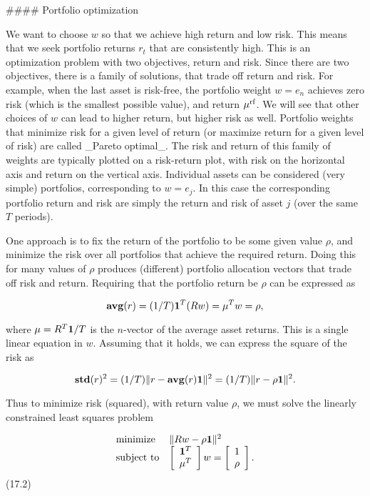 

#### Portfolio optimization

We want to choose \(w\) so that we achieve high return and low risk. This means that we seek portfolio returns \(r_{t}\) that are consistently high. This is an optimization problem with two objectives, return and risk. Since there are two objectives, there is a family of solutions, that trade off return and risk. For example, when the last asset is risk-free, the portfolio weight \(w=e_{n}\) achieves zero risk (which is the smallest possible value), and return \(\mu^{\rm rf}\). We will see that other choices of \(w\) can lead to higher return, but higher risk as well. Portfolio weights that minimize risk for a given level of return (or maximize return for a given level of risk) are called _Pareto optimal_. The risk and return of this family of weights are typically plotted on a risk-return plot, with risk on the horizontal axis and return on the vertical axis. Individual assets can be considered (very simple) portfolios, corresponding to \(w=e_{j}\). In this case the corresponding portfolio return and risk are simply the return and risk of asset \(j\) (over the same \(T\) periods).

One approach is to fix the return of the portfolio to be some given value \(\rho\), and minimize the risk over all portfolios that achieve the required return. Doing this for many values of \(\rho\) produces (different) portfolio allocation vectors that trade off risk and return. Requiring that the portfolio return be \(\rho\) can be expressed as

\[{\bf avg}(r)=(1/T){\bf 1}^{T}(Rw)=\mu^{T}w=\rho,\]

where \(\mu=R^{T}{\bf 1}/T\) is the \(n\)-vector of the average asset returns. This is a single linear equation in \(w\). Assuming that it holds, we can express the square of the risk as

\[{\bf std}(r)^{2}=(1/T)\|r-{\bf avg}(r){\bf 1}\|^{2}=(1/T)\|r-\rho{\bf 1}\|^{2}.\]

Thus to minimize risk (squared), with return value \(\rho\), we must solve the linearly constrained least squares problem

\[\begin{array}{ll}\mbox{minimize}&\|Rw-\rho{\bf 1}\|^{2}\\ \mbox{subject to}&\left[\begin{array}{c}{\bf 1}^{T}\\ \mu^{T}\end{array}\right]w=\left[\begin{array}{c}1\\ \rho\end{array}\right].\end{array}\] (17.2)

